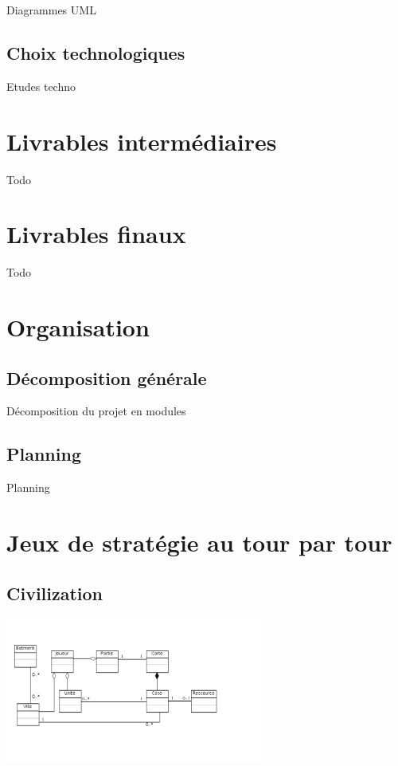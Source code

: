 \documentclass[a4paper,10pt]{report}
\begin{document}
      Diagrammes UML


    \section{Choix technologiques}

      Etudes techno



  \chapter{Livrables intermédiaires}

    Todo



  \chapter{Livrables finaux}

    Todo



  \chapter{Organisation}

    \section{Décomposition générale}

      Décomposition du projet en modules


    \section{Planning}

      Planning


\appendix

\chapter{Jeux de stratégie au tour par tour}

	\section{Civilization}

		\includegraphics[width=320px]{diagrammes/concept_civilization.png}
\end{document}

